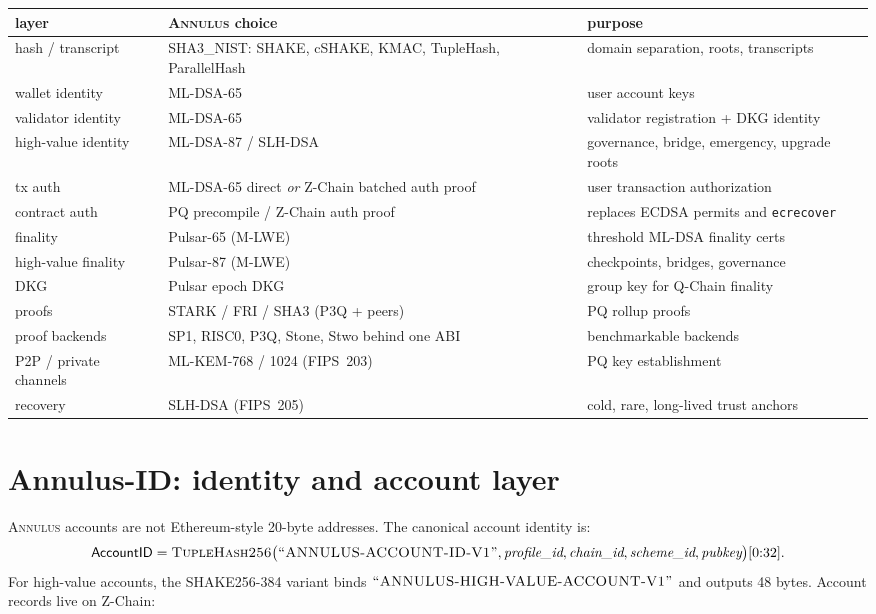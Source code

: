 \documentclass[11pt,a4paper]{article}
\newcommand{\Annulus}{\textsc{Annulus}}
\newcommand{\PQ}{\textsf{PQ}}
\begin{document}
\begin{center}\small
\begin{tabular}{l l l}
\toprule
layer & \Annulus{} choice & purpose \\
\midrule
hash / transcript & SHA3\_NIST: SHAKE, cSHAKE, KMAC, TupleHash, ParallelHash & domain separation, roots, transcripts \\
wallet identity & ML-DSA-65 & user account keys \\
validator identity & ML-DSA-65 & validator registration + DKG identity \\
high-value identity & ML-DSA-87 / SLH-DSA & governance, bridge, emergency, upgrade roots \\
tx auth & ML-DSA-65 direct \emph{or} Z-Chain batched auth proof & user transaction authorization \\
contract auth & \PQ{} precompile / Z-Chain auth proof & replaces ECDSA permits and \texttt{ecrecover} \\
finality & Pulsar-65 (M-LWE) & threshold ML-DSA finality certs \\
high-value finality & Pulsar-87 (M-LWE) & checkpoints, bridges, governance \\
DKG & Pulsar epoch DKG & group key for Q-Chain finality \\
proofs & STARK / FRI / SHA3 (P3Q + peers) & \PQ{} rollup proofs \\
proof backends & SP1, RISC0, P3Q, Stone, Stwo behind one ABI & benchmarkable backends \\
P2P / private channels & ML-KEM-768 / 1024 (FIPS~203) & \PQ{} key establishment \\
recovery & SLH-DSA (FIPS~205) & cold, rare, long-lived trust anchors \\
\bottomrule
\end{tabular}
\end{center}

\section{Annulus-ID: identity and account layer}
\label{sec:annulus-id}

\Annulus{} accounts are not Ethereum-style 20-byte addresses. The
canonical account identity is:
\[
\textsf{AccountID} = \textsc{TupleHash256}\big(\textsc{``ANNULUS-ACCOUNT-ID-V1''},
\textit{profile\_id}, \textit{chain\_id}, \textit{scheme\_id},
\textit{pubkey}\big)[0{:}32].
\]
For high-value accounts, the SHAKE256-384 variant binds
$\textsc{``ANNULUS-HIGH-VALUE-ACCOUNT-V1''}$ and outputs 48 bytes.
Account records live on Z-Chain:
\end{document}
